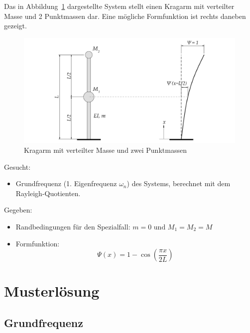 \documentclass[
  letterpaper,
  DIV=11]{scrreprt}
\providecommand{\tightlist}{%
  \setlength{\itemsep}{0pt}\setlength{\parskip}{0pt}}\usepackage{longtable,booktabs,array}
\begin{document}
Das in Abbildung~\ref{fig-kragarm_2_punkte} dargestellte System stellt
einen Kragarm mit verteilter Masse und 2 Punktmassen dar. Eine mögliche
Formfunktion ist rechts daneben gezeigt.

\begin{figure}[H]

{\centering \includegraphics{index_files/mediabag/bilder/aufgabe_rayleigh_2_massen.pdf}

}

\caption{\label{fig-kragarm_2_punkte}Kragarm mit verteilter Masse und
zwei Punktmassen}

\end{figure}

Gesucht:

\begin{itemize}
\tightlist
\item
  Grundfrequenz (1. Eigenfrequenz \(\omega_n\)) des Systems, berechnet
  mit dem Rayleigh-Quotienten.
\end{itemize}

Gegeben:

\begin{itemize}
\tightlist
\item
  Randbedingungen für den Spezialfall:
  \(m = 0 \text{ und } M_1 = M_2 = M\)
\item
  Formfunktion: \[ \Psi(x) = 1 - \cos(\frac{\pi x}{2L})\]
\end{itemize}

\newpage{}

\hypertarget{sec-ml_2punktmassen}{%
\section{Musterlösung}\label{sec-ml_2punktmassen}}

\hypertarget{grundfrequenz}{%
\subsection{Grundfrequenz}\label{grundfrequenz}}
\end{document}
